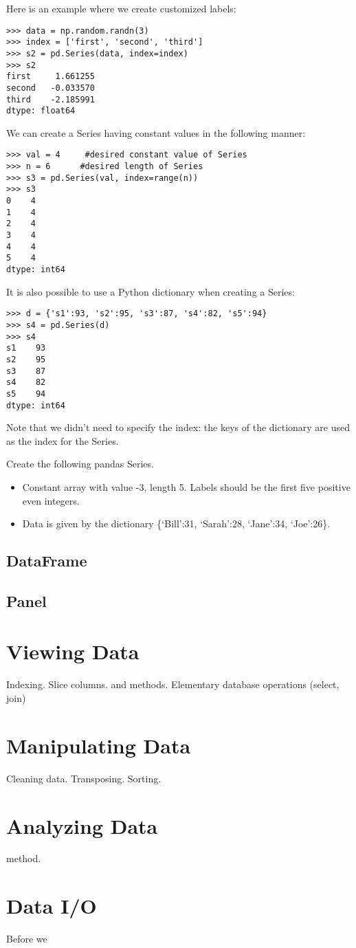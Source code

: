 Here is an example where we create customized labels:
\begin{lstlisting}
>>> data = np.random.randn(3)
>>> index = ['first', 'second', 'third']
>>> s2 = pd.Series(data, index=index)
>>> s2
first     1.661255
second   -0.033570
third    -2.185991
dtype: float64
\end{lstlisting}

We can create a Series having constant values in the following manner:
\begin{lstlisting}
>>> val = 4     #desired constant value of Series
>>> n = 6      #desired length of Series
>>> s3 = pd.Series(val, index=range(n))
>>> s3
0    4
1    4
2    4
3    4
4    4
5    4
dtype: int64
\end{lstlisting}

It is also possible to use a Python dictionary when creating a Series:
\begin{lstlisting}
>>> d = {'s1':93, 's2':95, 's3':87, 's4':82, 's5':94}
>>> s4 = pd.Series(d)
>>> s4
s1    93
s2    95
s3    87
s4    82
s5    94
dtype: int64
\end{lstlisting}
Note that we didn't need to specify the index: the keys of the dictionary are used as the index for the Series. 

\begin{problem}
Create the following pandas Series.

\begin{itemize}
\item Constant array with value -3, length 5. Labels should be the first five positive even integers.

\item Data is given by the dictionary \{`Bill':31, `Sarah':28, `Jane':34, `Joe':26\}.
\end{itemize}
\end{problem}


\subsection*{DataFrame}

\subsection*{Panel}

\section*{Viewing Data}
Indexing.
Slice columns.
 and  methods.
Elementary database operations (select, join)

\section*{Manipulating Data}
Cleaning data. Transposing. Sorting.

\section*{Analyzing Data}
 method.

\section*{Data I/O}
Before we
